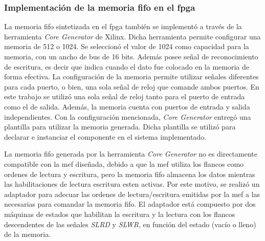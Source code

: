 	\subsubsection{Implementación de la memoria \acrshort{fifo} en el \acrshort{fpga}}
		La memoria \acrshort{fifo} sintetizada en el \acrshort{fpga} también se implementó a través de la herramienta {\it Core Generator} de Xilinx. Dicha herramienta permite configurar una memoria de \si{512} o \SI{1024}{\byte}. Se seleccionó el valor de \SI{1024}{\byte} como capacidad para la memoria, con un ancho de bus de 16 bits. Además posee señal de reconocimiento de escritura, es decir que indica cuando el dato fue colocado en la memoria de forma efectiva. La configuración de la memoria permite utilizar señales diferentes para cada puerto, o bien, una sola señal de reloj que comande ambos puertos. En este trabajo se utilizó una sola señal de reloj tanto para el puerto de entrada como el de salida. Además, la memoria cuenta con puertos de entrada y salida independientes. Con la configuración mencionada, {\it Core Generator} entregó una plantilla para utilizar la memoria generada. Dicha plantilla se utilizó para declarar e instanciar el componente en el sistema implementado. 
		
		
		La memoria \acrshort{fifo} generada por la herramienta \textit{Core Generator} no es directamente compatible con la \acrshort{mef} diseñada, debido a que la \acrshort{mef} utiliza los flancos como ordenes de lectura y escritura, pero la memoria \acrshort{fifo} almacena los datos mientras las habilitaciones de lectura escritura esten activas. Por este motivo, se realizó un adaptador para adecuar las ordenes de lectura/escritura emitidas por la \acrshort{mef} a las necesarias para comandar la memoria \acrshort{fifo}. El adaptador está compuesto por dos máquinas de estados que habilitan la escritura y la lectura con los flancos descendentes de las señales \textit{SLRD} y \textit{SLWR}, en función del estado (vacío o lleno) de la memoria.
		
